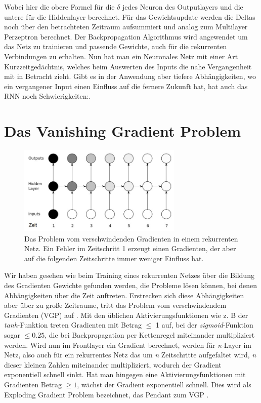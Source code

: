 Wobei hier die obere Formel für die $ \delta $ jedes Neuron des Outputlayers und die untere für die Hiddenlayer berechnet. Für das Gewichtsupdate werden die Deltas noch über den betrachteten Zeitraum aufsummiert und analog zum Multilayer Perzeptron berechnet. Der Backpropagation Algorithmus wird angewendet um das Netz zu trainieren und passende Gewichte, auch für die rekurrenten Verbindungen zu erhalten. Nun hat man ein Neuronales Netz mit einer Art Kurzzeitgedächtnis, welches beim Auswerten des Inputs die nahe Vergangenheit mit in Betracht zieht. Gibt es in der Anwendung aber tiefere Abhängigkeiten, wo ein vergangener Input einen Einfluss auf die fernere Zukunft hat, hat auch das RNN noch Schwierigkeiten:.
\section{Das Vanishing Gradient Problem}
\begin{figure}
	\centering
	\includegraphics[width=0.7\textwidth, height=160px]{pics/vgp.jpg}	
	\caption{Das Problem vom verschwindenden Gradienten in einem rekurrenten Netz. Ein Fehler im Zeitschritt 1 erzeugt einen Gradienten, der aber auf die folgenden Zeitschritte immer weniger Einfluss hat.\cite{bib:graves}}
	\label{img:vgp}
\end{figure}
Wir haben gesehen wie beim Training eines rekurrenten Netzes über die Bildung des Gradienten Gewichte gefunden werden, die Probleme lösen können, bei denen Abhängigkeiten über die Zeit auftreten. Erstrecken sich diese Abhängigkeiten aber über zu große Zeitraume, tritt das Problem vom verschwindendem Gradienten (VGP) auf \cite{bib:vgp}. Mit den üblichen Aktivierungsfunktionen wie z. B der \textit{tanh}-Funktion treten Gradienten mit Betrag \(\leq\) 1 auf, bei der \textit{sigmoid}-Funktion sogar \(\leq 0.25\), die bei Backpropagation per Kettenregel miteinander multipliziert werden. Wird nun im Frontlayer ein Gradient berechnet, werden für \textit{n}-Layer im Netz, also auch für ein rekurrentes Netz das um \textit{n} Zeitschritte aufgefaltet wird, \textit{n} dieser kleinen Zahlen miteinander multipliziert, wodurch der Gradient exponentiell schnell sinkt. Hat man hingegen eine Aktivierungsfunktionen mit Gradienten Betrag \(\geq 1\), wächst der Gradient exponentiell schnell. Dies wird als Exploding Gradient Problem bezeichnet, das Pendant zum VGP \cite{bib:egp}.

